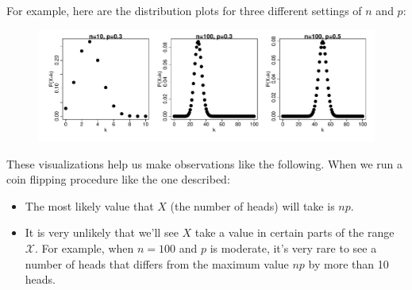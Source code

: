 \documentclass[11pt]{article}
\begin{document}
For example, here are the distribution plots for three different settings of $n$ and $p$:

\begin{figure}[h!]
\centering
\includegraphics[width=\textwidth]{images/bins.pdf}
\end{figure}

These visualizations help us make observations like the following. When we run a coin flipping procedure like the one described:
\begin{itemize}
\item The most likely value that $X$ (the number of heads) will take is $np$.
\item It is very unlikely that we'll see $X$ take a value in certain parts of the range $\mathcal X$. For example, when $n = 100$ and $p$ is moderate, it's very rare to see a number of heads that differs from the maximum value $np$ by more than 10 heads.
\end{itemize}
\end{document}

